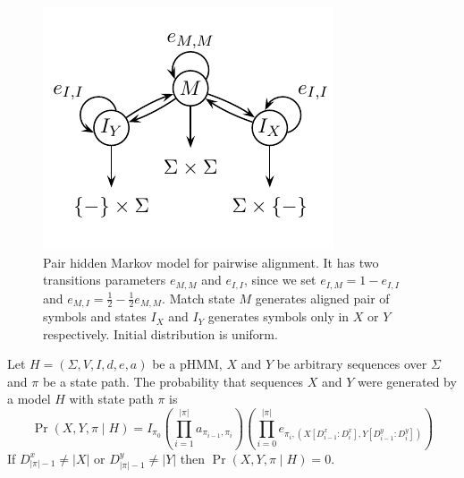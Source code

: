 \begin{example}
%
\begin{figure}
\begin{center}
\includegraphics{../figures/pairHMM.pdf}
\end{center}
\caption[Simple pair HMM model for alignment]{Pair hidden Markov model for
pairwise alignment. It has two transitions
parameters $e_{M,M}$ and $e_{I,I}$, since we set $e_{I,M} = 1 - e_{I,I}$ and
$e_{M,I}=\frac12-\frac12e_{M,M}$. Match state $M$ generates aligned pair of symbols
and states $I_X$ and $I_Y$ generates symbols only in $X$ or $Y$ respectively.
Initial distribution is uniform.
}\label{FIGURE:SIMPLEPHMM}
\end{figure}




\end{example}

\begin{definition}
Let $H=(\Sigma,V,I,d,e,a)$ be  a pHMM, $X$ and $Y$ be arbitrary sequences over
$\Sigma$ and $\pi$ be a state path. The probability that sequences $X$ and $Y$
were generated by a model $H$  with state path $\pi$ is
\begin{equation}
\Pr\left(X,Y,\pi\mid H\right)=
I_{\pi_0}
\left(
	\prod_{i=1}^{|\pi|}a_{\pi_{i-1},\pi_i}
\right)
\left(
	\prod_{i=0}^{|\pi|}e_{\pi_i,(X[D^x_{i-1}:D^x_{i}],Y[D^y_{i-1}:D^y_{i}])}
\right)
\end{equation}
If $D^x_{|\pi|-1}\not=|X|$ or $D^y_{|\pi|-1}\not=|Y|$ then
$\Pr\left(X,Y,\pi\mid H\right)=0$. 
\end{definition}

